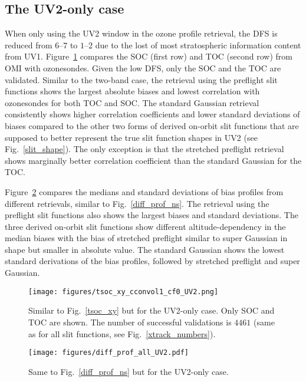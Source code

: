 \documentclass[amt,manuscript]{copernicus}
\begin{document}
\subsection{The UV2-only case}
When only using the UV2 window in the ozone profile retrieval, the DFS is reduced from $6$--$7$ to $1$--$2$ due to the lost of most stratospheric information content from UV1.  Figure~\ref{tsoc_xy_UV2} compares the SOC (first row) and TOC (second row) from OMI with ozonesondes. Given the low DFS, only the SOC and the TOC are validated. Similar to the two-band case, the retrieval using the preflight slit functions shows the largest absolute biases and lowest correlation with ozonesondes for both TOC and SOC. The standard Gaussian retrieval consistently shows higher correlation coefficients and lower standard deviations of biases compared to the other two forms of derived on-orbit slit functions that are supposed to better represent the true slit function shapes in UV2 (see Fig.~\ref{slit_shape}). The only exception is that the stretched preflight retrieval shows marginally better correlation coefficient than the standard Gaussian for the TOC.

Figure~\ref{diff_prof_UV2} compares the medians and standard deviations of bias profiles from different retrievals, similar to Fig.~\ref{diff_prof_ns}. The retrieval using the preflight slit functions also shows the largest biases and standard deviations. The three derived on-orbit slit functions show different altitude-dependency in the median biases with the bias of stretched preflight similar to super Gaussian in shape but smaller in absolute value. The standard Gaussian shows the lowest standard derivations of the bias profiles, followed by stretched preflight and super Gaussian.

\begin{figure*}[tbhp]
\texttt{[image: figures/tsoc\_xy\_cconvol1\_cf0\_UV2.png]}
\caption{Similar to Fig.~\ref{tsoc_xy} but for the UV2-only case. Only SOC and TOC are shown. The number of successful validations is $4461$ (same as for all slit functions, see Fig.~\ref{xtrack_numbers}).}
\label{tsoc_xy_UV2}
\end{figure*}

\begin{figure}[t]
\texttt{[image: figures/diff\_prof\_all\_UV2.pdf]}
\caption{Same to Fig.~\ref{diff_prof_ns} but for the UV2-only case.}
\label{diff_prof_UV2}
\end{figure}
\end{document}
